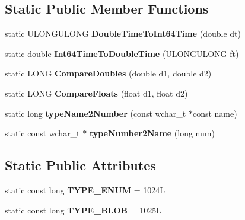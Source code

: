 \subsection*{Static Public Member Functions}
\begin{DoxyCompactItemize}
\item 
\mbox{\label{class_canberra_1_1_utility_1_1_core_1_1_variant_a6c2146a79402b4636837dff5786ebf23}} 
static U\+L\+O\+N\+G\+U\+L\+O\+NG {\bfseries Double\+Time\+To\+Int64\+Time} (double dt)
\item 
\mbox{\label{class_canberra_1_1_utility_1_1_core_1_1_variant_a3585cc4461ae63789b8bf3c487c92dcf}} 
static double {\bfseries Int64\+Time\+To\+Double\+Time} (U\+L\+O\+N\+G\+U\+L\+O\+NG ft)
\item 
\mbox{\label{class_canberra_1_1_utility_1_1_core_1_1_variant_ab0ab4594f9d701de44b86d91c10753df}} 
static L\+O\+NG {\bfseries Compare\+Doubles} (double d1, double d2)
\item 
\mbox{\label{class_canberra_1_1_utility_1_1_core_1_1_variant_a51dd9b74aaf587fd204c66b3dfb7b38a}} 
static L\+O\+NG {\bfseries Compare\+Floats} (float d1, float d2)
\item 
\mbox{\label{class_canberra_1_1_utility_1_1_core_1_1_variant_addbc31b338030d7086e9e44ab01fc3a2}} 
static long {\bfseries type\+Name2\+Number} (const wchar\+\_\+t $\ast$const name)
\item 
\mbox{\label{class_canberra_1_1_utility_1_1_core_1_1_variant_abbe5fa778a0d79ac90b21f9e6fb32c2d}} 
static const wchar\+\_\+t $\ast$ {\bfseries type\+Number2\+Name} (long num)
\end{DoxyCompactItemize}
\subsection*{Static Public Attributes}
\begin{DoxyCompactItemize}
\item 
\mbox{\label{class_canberra_1_1_utility_1_1_core_1_1_variant_ac15a41b5e92e03ce986e390d27ee83fa}} 
static const long {\bfseries T\+Y\+P\+E\+\_\+\+E\+N\+UM} = 1024L
\item 
\mbox{\label{class_canberra_1_1_utility_1_1_core_1_1_variant_a755a00b9bc91211d4a0db1ac27ef0ded}} 
static const long {\bfseries T\+Y\+P\+E\+\_\+\+B\+L\+OB} = 1025L
\end{DoxyCompactItemize}
